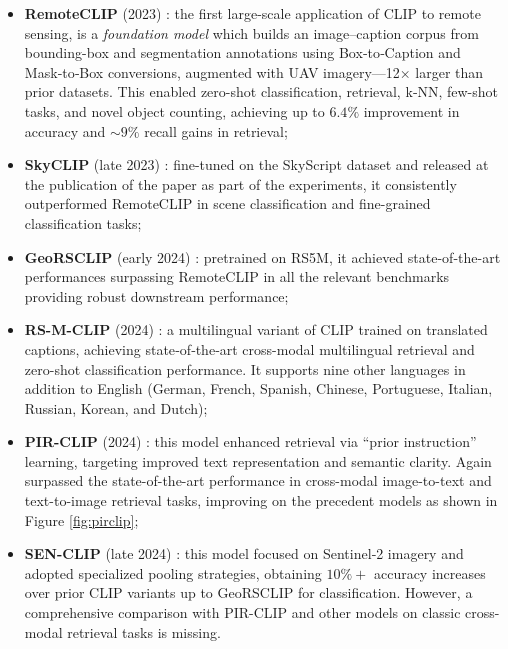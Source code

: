 \documentclass[a4paper, oneside, english]{sapthesis} %
\begin{document}
\begin{itemize}
    \item \textbf{RemoteCLIP} (2023) \cite{liu2024remoteclip}: the first large-scale application of CLIP to remote sensing, is a \emph{foundation model} which builds an image–caption corpus from bounding-box and segmentation annotations using Box‑to‑Caption and Mask‑to‑Box conversions, augmented with UAV imagery—12× larger than prior datasets. This enabled zero-shot classification, retrieval, k‑NN, few-shot tasks, and novel object counting, achieving up to $6.4\%$ improvement in accuracy and $\sim 9\%$ recall gains in retrieval;
    \item \textbf{SkyCLIP} (late 2023) \cite{wang2024skyscript}: fine-tuned on the SkyScript dataset and released at the publication of the paper as part of the experiments, it consistently outperformed RemoteCLIP in scene classification and fine-grained classification tasks;
    \item \textbf{GeoRSCLIP} (early 2024) \cite{zhang2024rs5m}: pretrained on RS5M, it achieved state-of-the-art performances surpassing RemoteCLIP in all the relevant benchmarks providing robust downstream performance;
    \item \textbf{RS-M-CLIP} (2024) \cite{silva2024multilingual}: a multilingual variant of CLIP trained on translated captions, achieving state‑of‑the‑art cross-modal multilingual retrieval and zero-shot classification performance. It supports nine other languages in addition to English (German, French, Spanish, Chinese, Portuguese, Italian, Russian, Korean, and Dutch);
    \item \textbf{PIR-CLIP} (2024) \cite{pan2024pir}: this model enhanced retrieval via “prior instruction” learning, targeting improved text representation and semantic clarity. Again surpassed the state-of-the-art performance in cross-modal image-to-text and text-to-image retrieval tasks, improving on the precedent models as shown in Figure \ref{fig:pirclip};
    \item \textbf{SEN-CLIP} (late 2024) \cite{jain2025senclip}: this model focused on Sentinel‑2 imagery and adopted specialized pooling strategies, obtaining $10\%+$ accuracy increases over prior CLIP variants up to GeoRSCLIP for classification. However, a comprehensive comparison with PIR-CLIP and other models on classic cross-modal retrieval tasks is missing.
\end{itemize}
\end{document}
